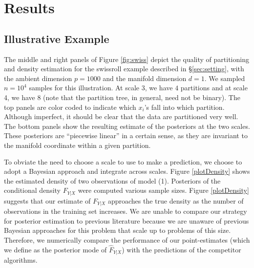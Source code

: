 \documentclass{article} %
\providecommand{\mh}[1]{\hat{#1}}
\begin{document}
\section{Results}

\subsection{Illustrative Example} \label{sub:ill}

The middle and right panels of Figure \ref{fig:swiss} depict the quality of partitioning and density estimation for the swissroll example described in \S \ref{sec:setting}, with the ambient dimension $p=1000$ and the manifold dimension $d=1$.  We sampled $n=10^4$ samples for this illustration. At scale 3, we have $4$ partitions and at scale 4, we have $8$ (note that the partition tree, in general, need not be binary).  The top panels are color coded to indicate which  $x_i$'s fall into which partition.  Although imperfect, it should be clear that the data are partitioned very well.  The bottom panels show the resulting estimate of the posteriors at the two scales.  These posteriors are ``piecewise linear'' in a certain sense, as they are invariant to the manifold coordinate within a given partition.  

To obviate the need to choose a scale to use to make a prediction, we choose to adopt a Bayesian approach and integrate across scales.  Figure \ref{plotDensity} shows the estimated density of two observations of model (1).  Posteriors of the conditional density  $F_{Y|X}$  were computed various sample sizes. Figure \ref{plotDensity} suggests that our estimate of $F_{Y|X}$ approaches the true density as the number of observations in the training set increases. We are unable to compare our strategy for posterior estimation to previous literature because we are unaware of previous Bayesian approaches for this problem that scale up to problems of this size. Therefore, we numerically compare the performance of our point-estimates (which we define as the posterior mode of $\mh{F}_{Y|X}$) with the predictions of the competitor algorithms.
\end{document}

